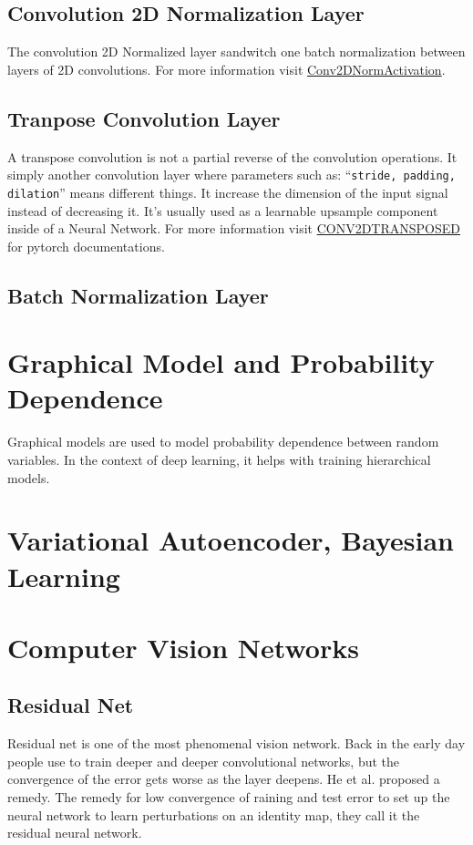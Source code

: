 \documentclass[]{article}
\theoremstyle{definition}
\numberwithin{equation}{subsection}
\newcommand{\inlinecode}[1]{\texttt{\footnotesize #1}}
\begin{document}
    \subsection{Convolution 2D Normalization Layer}
        The convolution 2D Normalized layer sandwitch one batch normalization between layers of 2D convolutions. 
        For more information visit \href{https://pytorch.org/vision/main/generated/torchvision.ops.Conv2dNormActivation.html}{Conv2DNormActivation}. 
        
    
    \subsection{Tranpose Convolution Layer}
        A transpose convolution is not a partial reverse of the convolution operations. 
        It simply another convolution layer where parameters such as: ``\inlinecode{stride, padding, dilation}'' means different things. 
        It increase the dimension of the input signal instead of decreasing it. 
        It's usually used as a learnable upsample component inside of a Neural Network. 
        For more information visit \href{https://pytorch.org/docs/stable/generated/torch.nn.ConvTranspose1d.html}{CONV2DTRANSPOSED} for pytorch documentations. 
    
    \subsection{Batch Normalization Layer}
        
        
    
\section{Graphical Model and Probability Dependence}
    Graphical models are used to model probability dependence between random variables. 
    In the context of deep learning, it helps with training hierarchical models. 
    
    
\section{Variational Autoencoder, Bayesian Learning}
    
    
\section{Computer Vision Networks}
    \subsection{Residual Net}
        Residual net is one of the most phenomenal vision network. 
        Back in the early day people use to train deeper and deeper convolutional networks, but the convergence of the error gets worse as the layer deepens. 
        He et al.\cite{he_deep_2015} proposed a remedy. 
        The remedy for low convergence of raining and test error to set up the neural network to learn perturbations on an identity map, they call it the residual neural network. 
\end{document}
